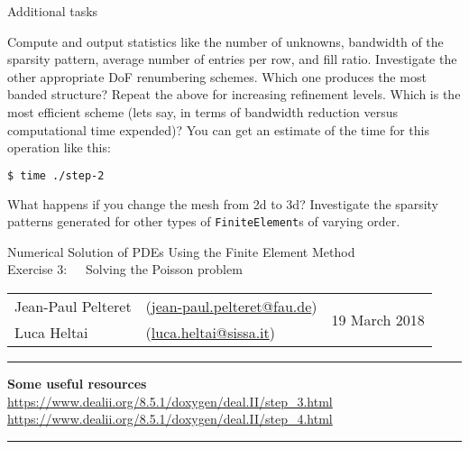 \documentclass[11pt,answers]{exam}
\makeatletter
\newcommand{\makeheader}[3]{%
\setcounter{question}{0}
\begin{center}
{\sc Numerical Solution of PDEs Using the Finite Element Method}\vspace{2ex}\\
{\sc Exercise #1:\ \ \ #2}\vspace{2ex}\\
\begin{tabular*}{\textwidth}{ll @{\extracolsep{\fill}}r}
Jean-Paul Pelteret & (\url{jean-paul.pelteret@fau.de}) & \multirow{2}{*}{#3} \\
Luca Heltai & (\url{luca.heltai@sissa.it}) & \\
\end{tabular*}
\end{center}
}
\newcommand{\makeresources}[1]{%
\rule{\textwidth}{0.6mm}
\textbf{Some useful resources}\\[1.5ex]
#1 \par
\rule{\textwidth}{0.6mm}
}
\makeatother
\begin{document}
\begin{questions}

\question Additional tasks
\begin{parts}
\bonuspart Compute and output statistics like the number of unknowns, bandwidth of the sparsity pattern, average number of entries per row, and fill ratio.
\bonuspart Investigate the other appropriate DoF renumbering schemes. Which one produces the most banded structure?
\bonuspart Repeat the above for increasing refinement levels. Which is the most efficient scheme (lets say, in terms of bandwidth reduction versus computational time expended)?  You can get an estimate of the time for this operation like this:
\begin{lstlisting}[language=bash]
$ time ./step-2
\end{lstlisting}
\bonuspart What happens if you change the mesh from 2d to 3d?
\bonuspart Investigate the sparsity patterns generated for other types of \verb|FiniteElement|s of varying order.
\end{parts}

\end{questions}




\clearpage
\makeheader{3}{Solving the Poisson problem}{19 March 2018}
\makeresources{%
\url{https://www.dealii.org/8.5.1/doxygen/deal.II/step_3.html} \\
\url{https://www.dealii.org/8.5.1/doxygen/deal.II/step_4.html}
}
\end{document}
